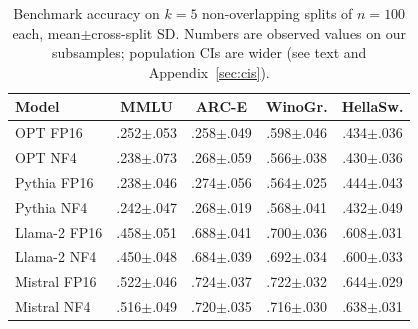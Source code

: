 \documentclass{article}
\begin{document}
\begin{table}[t]
\caption{Benchmark accuracy on $k{=}5$ non-overlapping splits of $n{=}100$ each, mean$\pm$cross-split SD. Numbers are observed values on our subsamples; population CIs are wider (see text and Appendix~\ref{sec:cis}).}
\label{tab:accuracy}
\centering
\footnotesize
\setlength{\tabcolsep}{3pt}
\begin{tabular}{lcccc}
\toprule
Model & MMLU & ARC-E & WinoGr. & HellaSw. \\
\midrule
OPT FP16   & .252$\pm$.053 & .258$\pm$.049 & .598$\pm$.046 & .434$\pm$.036 \\
OPT NF4    & .238$\pm$.073 & .268$\pm$.059 & .566$\pm$.038 & .430$\pm$.036 \\
\midrule
Pythia FP16  & .238$\pm$.046 & .274$\pm$.056 & .564$\pm$.025 & .444$\pm$.043 \\
Pythia NF4   & .242$\pm$.047 & .268$\pm$.019 & .568$\pm$.041 & .432$\pm$.049 \\
\midrule
Llama-2 FP16 & .458$\pm$.051 & .688$\pm$.041 & .700$\pm$.036 & .608$\pm$.031 \\
Llama-2 NF4  & .450$\pm$.048 & .684$\pm$.039 & .692$\pm$.034 & .600$\pm$.033 \\
\midrule
Mistral FP16 & .522$\pm$.046 & .724$\pm$.037 & .722$\pm$.032 & .644$\pm$.029 \\
Mistral NF4  & .516$\pm$.049 & .720$\pm$.035 & .716$\pm$.030 & .638$\pm$.031 \\
\bottomrule
\end{tabular}
\end{table}
\end{document}
